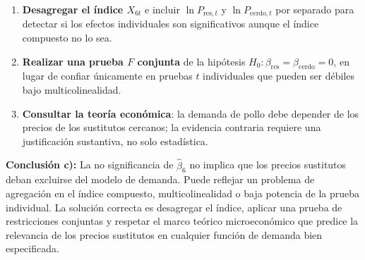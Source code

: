 \documentclass[12pt, letterpaper]{article}
\begin{document}
\begin{enumerate}[leftmargin=1.8cm, label=\textbf{\arabic*.}]
  \item \textbf{Desagregar el índice $X_{6t}$} e incluir $\ln P_{\text{res},t}$
    y $\ln P_{\text{cerdo},t}$ por separado para detectar si los efectos
    individuales son significativos aunque el índice compuesto no lo sea.
  \item \textbf{Realizar una prueba $F$ conjunta} de la hipótesis
    $H_0: \beta_{\text{res}} = \beta_{\text{cerdo}} = 0$, en lugar de
    confiar únicamente en pruebas $t$ individuales que pueden ser
    débiles bajo multicolinealidad.
  \item \textbf{Consultar la teoría económica}: la demanda de pollo
    debe depender de los precios de los sustitutos cercanos; la evidencia
    contraria requiere una justificación sustantiva, no solo estadística.
\end{enumerate}

\begin{clave}
  \textbf{Conclusión c):} La no significancia de $\hat{\beta}_6$
  no implica que los precios sustitutos deban excluirse del modelo de
  demanda. Puede reflejar un problema de agregación en el índice compuesto,
  multicolinealidad o baja potencia de la prueba individual. La solución
  correcta es desagregar el índice, aplicar una prueba de restricciones
  conjuntas y respetar el marco teórico microeconómico que predice la
  relevancia de los precios sustitutos en cualquier función de demanda
  bien especificada.
\end{clave}
\end{document}
